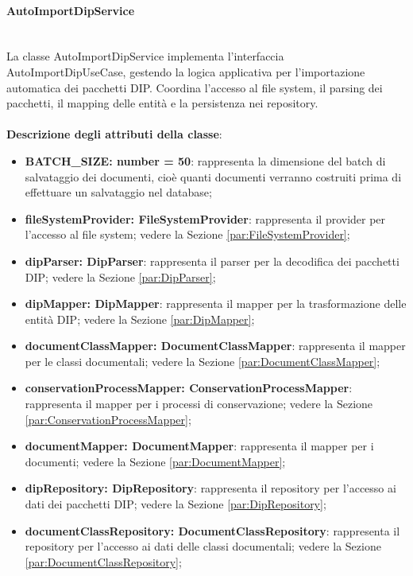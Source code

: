 \documentclass[a4paper,12pt]{article}
\begin{document}
{{{                \paragraph{AutoImportDipService}\label{par:AutoImportDipService}\mbox{}\\
                La classe AutoImportDipService implementa l'interfaccia AutoImportDipUseCase, gestendo la logica applicativa per l'importazione automatica dei pacchetti DIP. Coordina l'accesso al file system, il parsing dei pacchetti, il mapping delle entità e la persistenza nei repository.\\
                \\
                \textbf{Descrizione degli attributi della classe}:
                \begin{itemize}
                    \item \textbf{BATCH\_SIZE: number = 50}: rappresenta la dimensione del batch di salvataggio dei documenti, cioè quanti documenti verranno costruiti prima di effettuare un salvataggio nel database;
                    \item \textbf{fileSystemProvider: FileSystemProvider}: rappresenta il provider per l'accesso al file system; vedere la Sezione \ref{par:FileSystemProvider};
                    \item \textbf{dipParser: DipParser}: rappresenta il parser per la decodifica dei pacchetti DIP; vedere la Sezione \ref{par:DipParser};
                    \item \textbf{dipMapper: DipMapper}: rappresenta il mapper per la trasformazione delle entità DIP; vedere la Sezione \ref{par:DipMapper};
                    \item \textbf{documentClassMapper: DocumentClassMapper}: rappresenta il mapper per le classi documentali; vedere la Sezione \ref{par:DocumentClassMapper};
                    \item \textbf{conservationProcessMapper: ConservationProcessMapper}: rappresenta il mapper per i processi di conservazione; vedere la Sezione \ref{par:ConservationProcessMapper};
                    \item \textbf{documentMapper: DocumentMapper}: rappresenta il mapper per i documenti; vedere la Sezione \ref{par:DocumentMapper};
                    \item \textbf{dipRepository: DipRepository}: rappresenta il repository per l'accesso ai dati dei pacchetti DIP; vedere la Sezione \ref{par:DipRepository};
                    \item \textbf{documentClassRepository: DocumentClassRepository}: rappresenta il repository per l'accesso ai dati delle classi documentali; vedere la Sezione \ref{par:DocumentClassRepository};

\end{itemize}}}}
\end{document}
